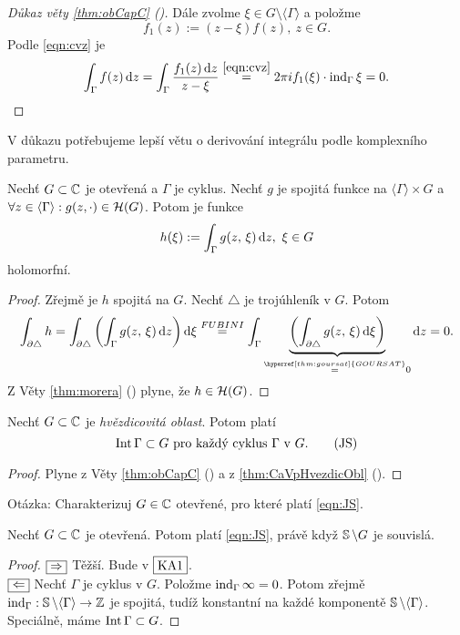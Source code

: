 \begin{proof}[Důkaz věty \cref{thm:obCapC} ()]
    Dále zvolme $\xi\in G\setminus\langle\Gamma\rangle$ a položme 
    $$f_1(z):=(z-\xi)f(z),\ z\in G.$$ Podle \cref{eqn:cvz} je $$\int_\Gamma f(z)\diff z=\int_\Gamma\frac{f_1(z) \diff z}{z-\xi}\stackrel{\cref{eqn:cvz}}{=}2\pi i f_1(\xi)\cdot\ind_\Gamma\xi=0.$$
\end{proof}
V důkazu potřebujeme lepší větu o derivování integrálu podle komplexního parametru.

\begin{theorem}
Nechť $G\subset\operatorname{\mathbb{C}}$ je otevřená a $\Gamma$ je cyklus. Nechť $g$ je spojitá funkce na $\langle\Gamma\rangle\times G$ a $\forall z\in \langle\Gamma\rangle:g(z,\cdot)\in \operatorname{\mathcal{H}}(G)$. Potom je funkce $$h(\xi):=\int_\Gamma g(z,\, \xi)\diff z,\ \xi \in G$$ holomorfní.
\end{theorem}

\begin{proof}
Zřejmě je $h$ spojitá na $G$. Nechť $\triangle$ je trojúhleník v $G$. Potom $$\int_{\partial\triangle}h=\int_{\partial\triangle}\left(\int_\Gamma g(z,\, \xi)\diff z\right)\diff \xi \stackrel{FUBINI}{=}\int_\Gamma\underbrace{\left(\int_{\partial\triangle} g(z,\, \xi)\diff \xi \right)}_{\stackrel{\hyperref[thm:goursat]{GOURSAT}}{=}0}\diff z = 0.$$ 
Z Věty \cref{thm:morera} () plyne, že $h\in\operatorname{\mathcal{H}}(G)$.
\end{proof}

\begin{note} Nechť $G\subset\operatorname{\mathbb{C}}$ je \emph{hvězdicovitá oblast}. Potom platí 
\begin{equation}
    \operatorname{Int}\Gamma\subset G \text{ pro každý cyklus } \Gamma \text{ v } G.
    \tag{JS}
    \label{eqn:JS}
\end{equation}
\end{note}
\begin{proof}
Plyne z Věty \cref{thm:obCapC} () a z \cref{thm:CaVpHvezdicObl} ().
\end{proof}

 Otázka: Charakterizuj $G\in\operatorname{\mathbb{C}}$ otevřené, pro které platí \cref{eqn:JS}.
 
\begin{theorem} 
Nechť $G\subset\operatorname{\mathbb{C}}$ je otevřená. Potom platí \cref{eqn:JS}, právě když $\operatorname{\mathbb{S}}\setminus G$ je souvislá.
\end{theorem}

\begin{proof}
$\fbox{$\Rightarrow$}$ Těžší. Bude v $\fbox{KA1}$.\\
$\fbox{$\Leftarrow$}$ Nechť $\Gamma$ je cyklus v $G$. Položme $\operatorname{ind}_\Gamma \infty=0$. Potom zřejmě $\operatorname{ind}_\Gamma:\operatorname{\mathbb{S}}\setminus\langle\Gamma\rangle\rightarrow \operatorname{\mathbb{Z}}$ je spojitá, tudíž konstantní na každé komponentě $\operatorname{\mathbb{S}}\setminus\langle\Gamma\rangle$. Speciálně, máme $\operatorname{Int}\Gamma\subset G$.
\end{proof}

